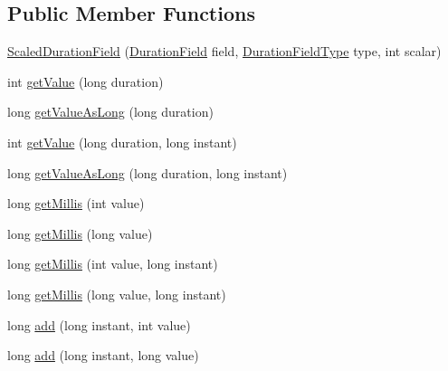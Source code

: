 \subsection*{Public Member Functions}
\begin{DoxyCompactItemize}
\item 
\hyperlink{classorg_1_1joda_1_1time_1_1field_1_1_scaled_duration_field_ac3329dea82ed92469536a57bea32886c}{Scaled\-Duration\-Field} (\hyperlink{classorg_1_1joda_1_1time_1_1_duration_field}{Duration\-Field} field, \hyperlink{classorg_1_1joda_1_1time_1_1_duration_field_type}{Duration\-Field\-Type} type, int scalar)
\item 
int \hyperlink{classorg_1_1joda_1_1time_1_1field_1_1_scaled_duration_field_aa7209449cbbf50fd49f8d00db4d0452a}{get\-Value} (long duration)
\item 
long \hyperlink{classorg_1_1joda_1_1time_1_1field_1_1_scaled_duration_field_aa05cbad813a3d90edbfcadf79fbe8075}{get\-Value\-As\-Long} (long duration)
\item 
int \hyperlink{classorg_1_1joda_1_1time_1_1field_1_1_scaled_duration_field_a0725cbdd2dd34e0929ca7e462417046b}{get\-Value} (long duration, long instant)
\item 
long \hyperlink{classorg_1_1joda_1_1time_1_1field_1_1_scaled_duration_field_aa2de0de25f4855b12c97d54692b6a63a}{get\-Value\-As\-Long} (long duration, long instant)
\item 
long \hyperlink{classorg_1_1joda_1_1time_1_1field_1_1_scaled_duration_field_a071f0eac8fb5504aad8d4d4b43c7c476}{get\-Millis} (int value)
\item 
long \hyperlink{classorg_1_1joda_1_1time_1_1field_1_1_scaled_duration_field_a6c25858aa76109a63978fb0e34041d9d}{get\-Millis} (long value)
\item 
long \hyperlink{classorg_1_1joda_1_1time_1_1field_1_1_scaled_duration_field_a43c565c2c624166aad627bc91e01fc78}{get\-Millis} (int value, long instant)
\item 
long \hyperlink{classorg_1_1joda_1_1time_1_1field_1_1_scaled_duration_field_ad74d0f6a857019d825dacef386f74cfa}{get\-Millis} (long value, long instant)
\item 
long \hyperlink{classorg_1_1joda_1_1time_1_1field_1_1_scaled_duration_field_a248500399fa11514987785346585d33c}{add} (long instant, int value)
\item 
long \hyperlink{classorg_1_1joda_1_1time_1_1field_1_1_scaled_duration_field_a873e7e02586bef214818d1ba3c2fd2a5}{add} (long instant, long value)
\item 

\end{DoxyCompactItemize}
